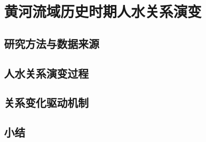 \chapter{黄河流域历史时期人水关系演变}\label{cha:3}


\section{研究方法与数据来源}\label{ch3:methods}



\section{人水关系演变过程}\label{ch3:process}


\section{关系变化驱动机制}\label{ch3:mechanism}





\section{小结}\label{ch3:summary}

